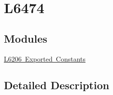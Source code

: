\hypertarget{group___l6474}{}\section{L6474}
\label{group___l6474}
\subsection*{Modules}
\begin{DoxyCompactItemize}
\item 
\mbox{\hyperlink{group___l6206___exported___constants}{L6206 Exported Constants}}
\end{DoxyCompactItemize}


\subsection{Detailed Description}
